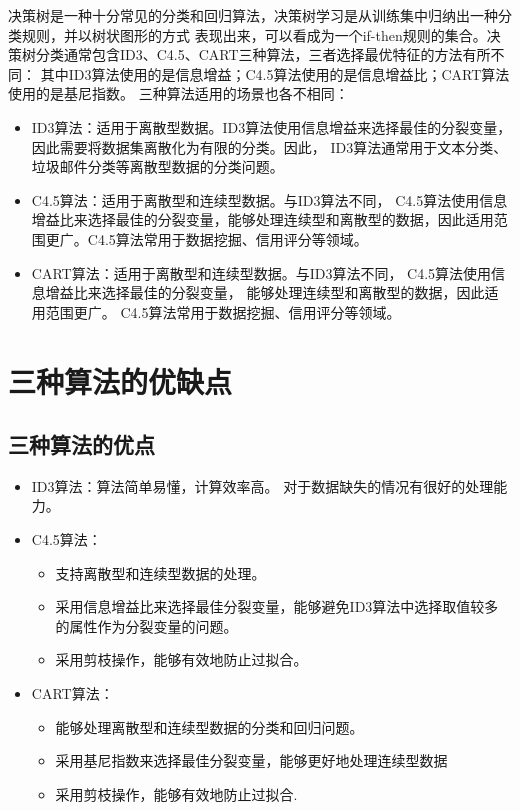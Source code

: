 \documentclass{SHUarticle}
\title{\heiti{决策树算法总结}}
\date{\today}
\begin{document}
	\maketitle
	\begin{cnabstract}
		决策树是一种十分常见的分类和回归算法，决策树学习是从训练集中归纳出一种分类规则，并以树状图形的方式
		表现出来，可以看成为一个if-then规则的集合。决策树分类通常包含ID3、C4.5、CART三种算法，三者选择最优特征的方法有所不同：
		其中ID3算法使用的是信息增益；C4.5算法使用的是信息增益比；CART算法使用的是基尼指数。
		三种算法适用的场景也各不相同：
		\begin{itemize}
			\item ID3算法：适用于离散型数据。ID3算法使用信息增益来选择最佳的分裂变量，
			因此需要将数据集离散化为有限的分类。因此，
			ID3算法通常用于文本分类、垃圾邮件分类等离散型数据的分类问题。
			\item C4.5算法：适用于离散型和连续型数据。与ID3算法不同，
			C4.5算法使用信息增益比来选择最佳的分裂变量，能够处理连续型和离散型的数据，因此适用范围更广。C4.5算法常用于数据挖掘、信用评分等领域。
			\item  CART算法：适用于离散型和连续型数据。与ID3算法不同，
			C4.5算法使用信息增益比来选择最佳的分裂变量，
			能够处理连续型和离散型的数据，因此适用范围更广。
			C4.5算法常用于数据挖掘、信用评分等领域。
		\end{itemize}
	\end{cnabstract}
\section{三种算法的优缺点}
\subsection{三种算法的优点}
\begin{itemize}
	\item ID3算法：算法简单易懂，计算效率高。
	对于数据缺失的情况有很好的处理能力。
	\item C4.5算法：
	\begin{itemize}
		\item 支持离散型和连续型数据的处理。
		\item  采用信息增益比来选择最佳分裂变量，能够避免ID3算法中选择取值较多的属性作为分裂变量的问题。
		\item 采用剪枝操作，能够有效地防止过拟合。
	\end{itemize}
	\item CART算法：
	\begin{itemize}
		\item 能够处理离散型和连续型数据的分类和回归问题。
		\item 采用基尼指数来选择最佳分裂变量，能够更好地处理连续型数据
		\item 采用剪枝操作，能够有效地防止过拟合.
	\end{itemize}
\end{itemize}
\end{document}
